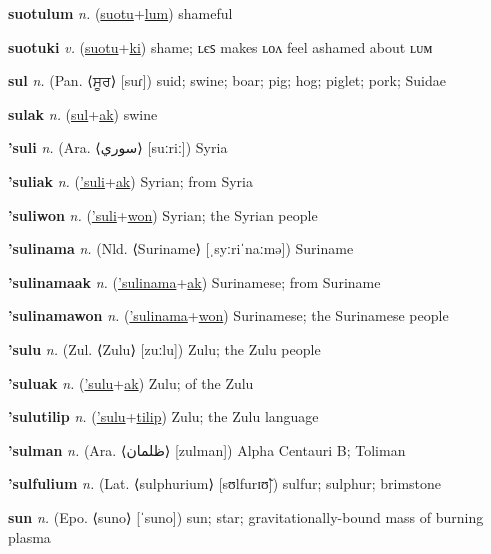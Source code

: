 \textbf{\hypertarget{suotulum}{suotulum}} \textit{n.} (\hyperlink{suotu}{suotu}+\allowbreak \hyperlink{lum}{lum})
shameful

\textbf{\hypertarget{suotuki}{suotuki}} \textit{v.} (\hyperlink{suotu}{suotu}+\allowbreak \hyperlink{ki}{ki})
shame; ʟєꜱ makes ʟᴏᴧ feel ashamed about ʟᴜᴍ

\textbf{\hypertarget{sul}{sul}} \textit{n.} (Pan. ⟨{\gurmukhi{}ਸੂਰ}⟩ [suɾ])
suid; swine; boar; pig; hog; piglet; pork; Suidae

\textbf{\hypertarget{sulak}{sulak}} \textit{n.} (\hyperlink{sul}{sul}+\allowbreak \hyperlink{ak}{ak})
swine

\textbf{\hypertarget{'suli}{'suli}} \textit{n.} (Ara. ⟨{\arabics{}سوري‎}⟩ [suːriː])
Syria

\textbf{\hypertarget{'suliak}{'suliak}} \textit{n.} (\hyperlink{'suli}{'suli}+\allowbreak \hyperlink{ak}{ak})
Syrian; from Syria

\textbf{\hypertarget{'suliwon}{'suliwon}} \textit{n.} (\hyperlink{'suli}{'suli}+\allowbreak \hyperlink{won}{won})
Syrian; the Syrian people

\textbf{\hypertarget{'sulinama}{'sulinama}} \textit{n.} (Nld. ⟨Suriname⟩ [ˌsyːriˈnaːmə])
Suriname

\textbf{\hypertarget{'sulinamaak}{'sulinamaak}} \textit{n.} (\hyperlink{'sulinama}{'sulinama}+\allowbreak \hyperlink{ak}{ak})
Surinamese; from Suriname

\textbf{\hypertarget{'sulinamawon}{'sulinamawon}} \textit{n.} (\hyperlink{'sulinama}{'sulinama}+\allowbreak \hyperlink{won}{won})
Surinamese; the Surinamese people

\textbf{\hypertarget{'sulu}{'sulu}} \textit{n.} (Zul. ⟨Zulu⟩ [zuːlu])
Zulu; the Zulu people

\textbf{\hypertarget{'suluak}{'suluak}} \textit{n.} (\hyperlink{'sulu}{'sulu}+\allowbreak \hyperlink{ak}{ak})
Zulu; of the Zulu

\textbf{\hypertarget{'sulutilip}{'sulutilip}} \textit{n.} (\hyperlink{'sulu}{'sulu}+\allowbreak \hyperlink{tilip}{tilip})
Zulu; the Zulu language

\textbf{\hypertarget{'sulman}{'sulman}} \textit{n.} (Ara. ⟨{\arabics{}ظلمان}⟩ [zulman])
Alpha Centauri B; Toliman

\textbf{\hypertarget{'sulfulium}{'sulfulium}} \textit{n.} (Lat. ⟨sulphurium⟩ [sʊlfurɪʊ̃])
sulfur; sulphur; brimstone

\textbf{\hypertarget{sun}{sun}} \textit{n.} (Epo. ⟨suno⟩ [ˈsuno])
sun; star; gravitationally-bound mass of burning plasma

